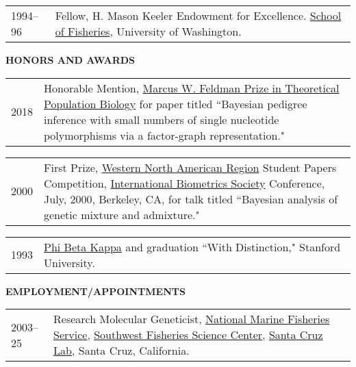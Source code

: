 \documentclass[11pt]{article}
\newlength{\myindent}
\newlength{\postskip}
\newlength{\preskip}
\newlength{\scndcol}
\begin{document}
\begin{tabular}{ @{}p{2.5\myindent} p{\scndcol}@{}  }
\hspace*{\myindent}1994--96 & Fellow,  H. Mason
Keeler Endowment for Excellence.  \href{http://www.fish.washington.edu/}{School of Fisheries}, University of
Washington.\\
\end{tabular}
\vspace*{\postskip}

{\bf HONORS AND AWARDS}
\vspace*{\preskip}

\begin{tabular}{ @{}p{2.5\myindent} p{\scndcol}@{}  }
\hspace*{\myindent}2018  &  Honorable Mention,  \href{https://doi.org/10.1016/j.tpb.2017.11.004}{Marcus W. Feldman Prize in Theoretical Population Biology} for paper titled ``Bayesian pedigree inference with small numbers of single nucleotide polymorphisms via a factor-graph representation."  \\
\end{tabular}

\begin{tabular}{ @{}p{2.5\myindent} p{\scndcol}@{}  }
\hspace*{\myindent}2000  &  First Prize,  \href{http://www.wnar.org/}{Western North American Region} Student Papers
Competition, \href{http://www.tibs.org/}{International Biometrics Society} Conference, July, 2000, Berkeley,
CA, for talk titled ``Bayesian analysis of genetic mixture and admixture."  \\
\end{tabular}

\begin{tabular}{ @{}p{2.5\myindent} p{\scndcol}@{}  }
\hspace*{\myindent}1993  &  \href{http://www.pbk.org/}{Phi Beta Kappa} and graduation ``With Distinction," Stanford University.\\
\end{tabular}
\vspace*{\postskip}

{\bf EMPLOYMENT/APPOINTMENTS}
\vspace*{\preskip}

\begin{tabular}{ @{}p{2.5\myindent} p{\scndcol}@{}  }
\hspace*{\myindent}2003--25 & Research Molecular Geneticist, \href{http://www.nmfs.noaa.gov/}{National 
Marine Fisheries Service}, \href{http://swfsc.nmfs.noaa.gov/}{Southwest Fisheries Science Center}, \href{http://santacruz.nmfs.noaa.gov/}{Santa Cruz Lab}, Santa Cruz,  California. 
\\
\end{tabular}
\end{document}
